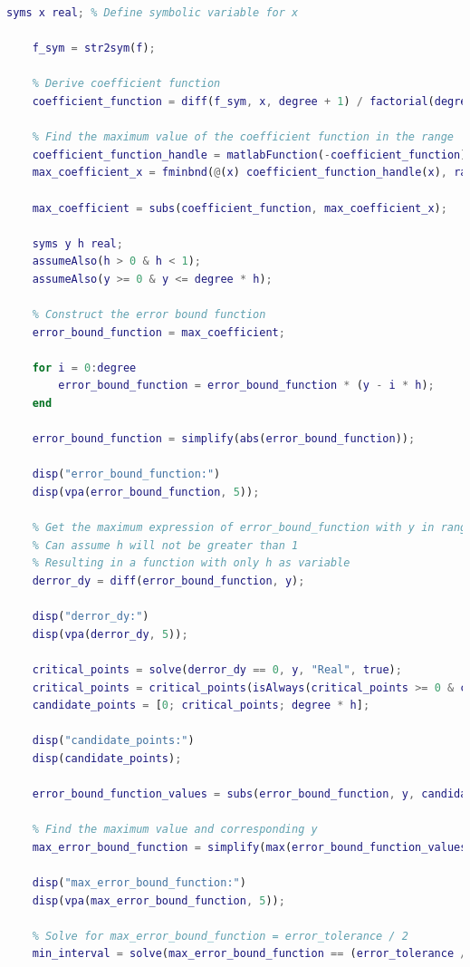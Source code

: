 \documentclass[conference,onecolumn]{IEEEtran}
\begin{document}
\begin{enumerate}[label=\arabic{enumi}.]
\begin{lstlisting}[language=MATLAB]
    syms x real; % Define symbolic variable for x

    f_sym = str2sym(f);

    % Derive coefficient function
    coefficient_function = diff(f_sym, x, degree + 1) / factorial(degree + 1);

    % Find the maximum value of the coefficient function in the range
    coefficient_function_handle = matlabFunction(-coefficient_function);
    max_coefficient_x = fminbnd(@(x) coefficient_function_handle(x), range(1), range(2));

    max_coefficient = subs(coefficient_function, max_coefficient_x);

    syms y h real;
    assumeAlso(h > 0 & h < 1);
    assumeAlso(y >= 0 & y <= degree * h);

    % Construct the error bound function
    error_bound_function = max_coefficient;

    for i = 0:degree
        error_bound_function = error_bound_function * (y - i * h);
    end

    error_bound_function = simplify(abs(error_bound_function));

    disp("error_bound_function:")
    disp(vpa(error_bound_function, 5));

    % Get the maximum expression of error_bound_function with y in range [0, degree * h] and h as positive constant
    % Can assume h will not be greater than 1
    % Resulting in a function with only h as variable
    derror_dy = diff(error_bound_function, y);

    disp("derror_dy:")
    disp(vpa(derror_dy, 5));

    critical_points = solve(derror_dy == 0, y, "Real", true);
    critical_points = critical_points(isAlways(critical_points >= 0 & critical_points <= degree * h));
    candidate_points = [0; critical_points; degree * h];

    disp("candidate_points:")
    disp(candidate_points);

    error_bound_function_values = subs(error_bound_function, y, candidate_points);

    % Find the maximum value and corresponding y
    max_error_bound_function = simplify(max(error_bound_function_values));

    disp("max_error_bound_function:")
    disp(vpa(max_error_bound_function, 5));

    % Solve for max_error_bound_function = error_tolerance / 2
    min_interval = solve(max_error_bound_function == (error_tolerance / 2), h, "Real", true);


\end{lstlisting}
\end{enumerate}
\end{document}
